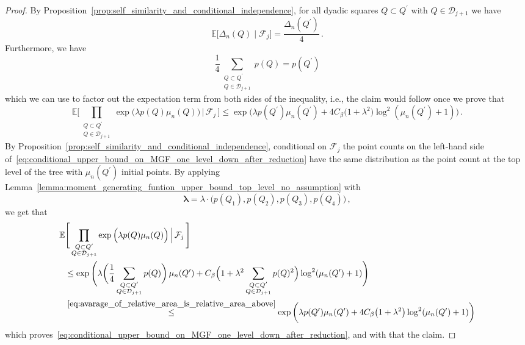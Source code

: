 \documentclass[11pt]{amsart}
\theoremstyle{definition}
\theoremstyle{remark}
\numberwithin{equation}{section}
\def\la{{\lambda}}
\newcommand{\bE}{\mathbb E}
\begin{document}
	\begin{proof}
		By Proposition~\ref{prop:self_similarity_and_conditional_independence}, for all dyadic squares $Q\subset Q^\prime$ with $Q\in \mathcal{D}_{j+1}$ we have
		\[
		\bE\big[\Delta_n(Q) \mid \mathcal{F}_j\big] = \frac{\Delta_n(Q^\prime)}{4} \, .
		\]
		Furthermore, we have
		\begin{equation}
			\label{eq:avarage_of_relative_area_is_relative_area_above}
			\frac{1}{4} \sum_{\substack{Q\subset Q^\prime \\ Q\in \mathcal{D}_{j+1}}} p(Q) = p(Q^\prime)
		\end{equation}
		which we can use to factor out the expectation term from both sides of the inequality, i.e., the claim would follow once we prove that 
		\begin{equation}
			\label{eq:conditional_upper_bound_on_MGF_one_level_down_after_reduction}
			\bE\Bigg[\prod_{\substack{Q\subset Q^\prime \\ Q\in \mathcal{D}_{j+1}}} \exp\Big(\la  p(Q)  \mu_n(Q)\Big)  \, \Big| \, \mathcal{F}_j \, \Bigg]  \le \exp\bigg(\la p(Q^\prime) \mu_n(Q^\prime) + 4C_\beta\big(1+\la^2\big)\log^2(\mu_n(Q^\prime)+1)\bigg) \, .
		\end{equation}
		By Proposition~\ref{prop:self_similarity_and_conditional_independence}, conditional on $\mathcal{F}_j$ the point counts on the left-hand side of~\eqref{eq:conditional_upper_bound_on_MGF_one_level_down_after_reduction} have the same distribution as the point count at the top level of the tree with $\mu_n(Q^\prime)$ initial points. By applying Lemma~\ref{lemma:moment_generating_funtion_upper_bound_top_level_no_assumption} with
		\[
		\boldsymbol{\la} = \la \cdot \big( p(Q_1), p(Q_2), p(Q_3), p(Q_4)\big)\, ,
		\]
		we get that
		\begin{align*}
			\bE&\Bigg[\prod_{\substack{Q\subset Q^\prime \\ Q\in \mathcal{D}_{j+1}}} \exp\Big(\la  p(Q)  \mu_n(Q)\Big)  \, \Big| \, \mathcal{F}_j \, \Bigg] \\ &\le \exp \Bigg(\la \bigg(\frac{1}{4}\sum_{\substack{Q\subset Q^\prime \\ Q\in \mathcal{D}_{j+1}}} p(Q) \bigg)\, \mu_n(Q^\prime) + C_\beta\Big(1+\la^2\sum_{\substack{Q\subset Q^\prime \\ Q\in \mathcal{D}_{j+1}}} p(Q)^2\Big)\log^2(\mu_n(Q^\prime)+1)\Bigg) \\ & \stackrel{\eqref{eq:avarage_of_relative_area_is_relative_area_above}}{\le} \exp\bigg(\la p(Q^\prime) \mu_n(Q^\prime) + 4C_\beta\big(1+\la^2\big)\log^2(\mu_n(Q^\prime)+1)\bigg)
		\end{align*}
		which proves~\eqref{eq:conditional_upper_bound_on_MGF_one_level_down_after_reduction}, and with that the claim.
	\end{proof}
\end{document}
